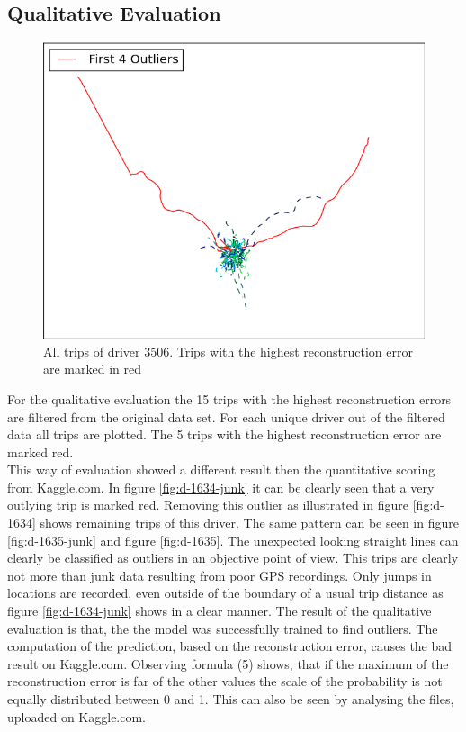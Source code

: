 \documentclass{vldb}
\begin{document}
\subsection{Qualitative Evaluation}

\begin{figure}
\centering
\includegraphics[width=0.8\linewidth]{"pics/outliers_junk/D_3506"}
\caption{All trips of driver 3506. Trips with the highest reconstruction error are marked in red}
\label{fig:d-3506}
\end{figure}

For the qualitative evaluation the 15 trips with the highest reconstruction errors are filtered from the original data set. For each unique driver out of the filtered data all trips are plotted. The 5 trips with the highest reconstruction error are marked red. \\
This way of evaluation showed a different result then the quantitative scoring from Kaggle.com. In figure \ref{fig:d-1634-junk} it can be clearly seen that a very outlying trip is marked red. Removing this outlier as illustrated in figure \ref{fig:d-1634} shows remaining trips of this driver. The same pattern can be seen in figure \ref{fig:d-1635-junk} and figure \ref{fig:d-1635}. The unexpected looking straight lines can clearly be classified as outliers in an objective point of view. This trips are clearly not more than junk data resulting from poor GPS recordings. Only jumps in locations are recorded, even outside of the boundary of a usual trip distance as figure \ref{fig:d-1634-junk} shows in a clear manner. The result of the qualitative evaluation is that, the the model was successfully trained to find outliers. The computation of the prediction, based on the reconstruction error, causes the bad result on Kaggle.com. Observing formula (5) shows, that if the maximum of the reconstruction error is far of the other values the scale of the probability is not equally distributed between 0 and 1. This can also be seen by analysing the files, uploaded on Kaggle.com.
\end{document}
